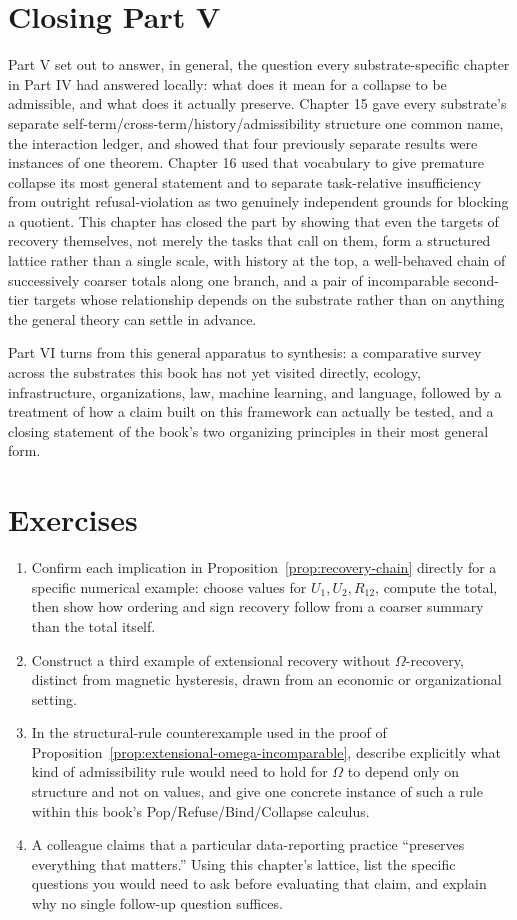 \documentclass[11pt]{book}
\begin{document}
\section{Closing Part V}

Part V set out to answer, in general, the question every substrate-specific chapter in Part IV had answered locally: what does it mean for a collapse to be admissible, and what does it actually preserve. Chapter 15 gave every substrate's separate self-term/cross-term/history/admissibility structure one common name, the interaction ledger, and showed that four previously separate results were instances of one theorem. Chapter 16 used that vocabulary to give premature collapse its most general statement and to separate task-relative insufficiency from outright refusal-violation as two genuinely independent grounds for blocking a quotient. This chapter has closed the part by showing that even the targets of recovery themselves, not merely the tasks that call on them, form a structured lattice rather than a single scale, with history at the top, a well-behaved chain of successively coarser totals along one branch, and a pair of incomparable second-tier targets whose relationship depends on the substrate rather than on anything the general theory can settle in advance.

Part VI turns from this general apparatus to synthesis: a comparative survey across the substrates this book has not yet visited directly, ecology, infrastructure, organizations, law, machine learning, and language, followed by a treatment of how a claim built on this framework can actually be tested, and a closing statement of the book's two organizing principles in their most general form.

\section*{Exercises}
\begin{enumerate}
\item Confirm each implication in Proposition~\ref{prop:recovery-chain} directly for a specific numerical example: choose values for $U_1,U_2,R_{12}$, compute the total, then show how ordering and sign recovery follow from a coarser summary than the total itself.
\item Construct a third example of extensional recovery without $\Omega$-recovery, distinct from magnetic hysteresis, drawn from an economic or organizational setting.
\item In the structural-rule counterexample used in the proof of Proposition~\ref{prop:extensional-omega-incomparable}, describe explicitly what kind of admissibility rule would need to hold for $\Omega$ to depend only on structure and not on values, and give one concrete instance of such a rule within this book's Pop/Refuse/Bind/Collapse calculus.
\item A colleague claims that a particular data-reporting practice ``preserves everything that matters.'' Using this chapter's lattice, list the specific questions you would need to ask before evaluating that claim, and explain why no single follow-up question suffices.
\end{enumerate}
\end{document}
